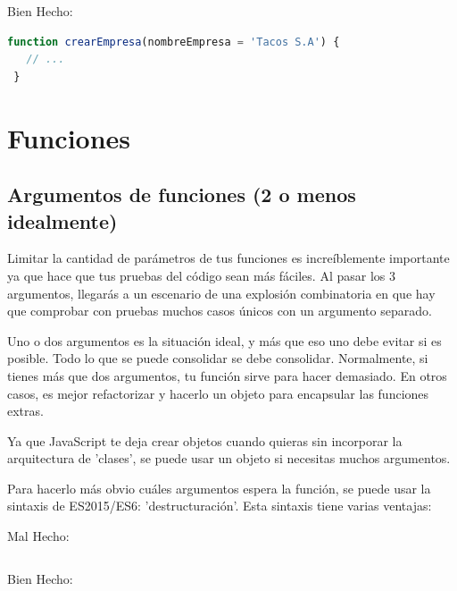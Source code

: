 \documentclass[a4paper, 12pt]{article}
\begin{document}
Bien Hecho:
\begin{lstlisting}[language=TypeScript, style=goodstyle]
 function crearEmpresa(nombreEmpresa = 'Tacos S.A') {
   // ...
 }
\end{lstlisting}

\newpage

\section{Funciones}

\subsection*{Argumentos de funciones (2 o menos idealmente)}

Limitar la cantidad de parámetros de tus funciones es increíblemente importante ya que hace que tus pruebas del código sean más fáciles. Al pasar los 3 argumentos, llegarás a un escenario de una explosión combinatoria en que hay que comprobar con pruebas muchos casos únicos con un argumento separado.

Uno o dos argumentos es la situación ideal, y más que eso uno debe evitar si es posible. Todo lo que se puede consolidar se debe consolidar. Normalmente, si tienes más que dos argumentos, tu función sirve para hacer demasiado. En otros casos, es mejor refactorizar y hacerlo un objeto para encapsular las funciones extras.

Ya que JavaScript te deja crear objetos cuando quieras sin incorporar la arquitectura de 'clases', se puede usar un objeto si necesitas muchos argumentos.

Para hacerlo más obvio cuáles argumentos espera la función, se puede usar la sintaxis de ES2015/ES6: 'destructuración'. Esta sintaxis tiene varias ventajas:









Mal Hecho:
\begin{lstlisting}[language=TypeScript, style=badstyle]
\end{lstlisting}
\vspace{0.5cm} %

Bien Hecho:
\begin{lstlisting}[language=TypeScript, style=goodstyle]
\end{lstlisting}
\end{document}
